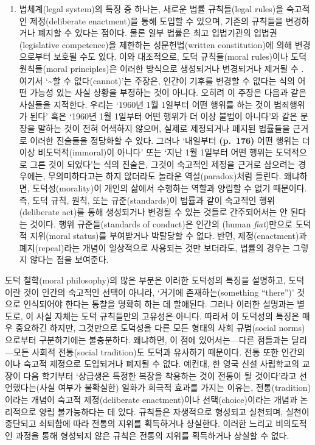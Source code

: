 \begin{enumerate}
\def\labelenumi{(\roman{enumi})}
\setcounter{enumi}{1}
\tightlist
\item
  법체계(legal system)의 특징 중 하나는, 새로운 법률 규칙들(legal
  rules)을 숙고적인 제정(deliberate enactment)을 통해 도입할 수 있으며,
  기존의 규칙들을 변경하거나 폐지할 수 있다는 점이다. 물론 일부 법률은
  최고 입법기관의 입법권(legislative competence)을 제한하는
  성문헌법(written constitution)에 의해 변경으로부터 보호될 수도 있다.
  이와 대조적으로, 도덕 규칙들(moral rules)이나 도덕 원칙들(moral
  principles)은 이러한 방식으로 생성되거나 변경되거나 제거될 수
  . 여기서 `\textasciitilde 할 수 없다(cannot)'는 주장은,
  인간이 기후를 변경할 수 없다는 식의 어떤 가능성 있는 사실 상황을
  부정하는 것이 아니다. 오히려 이 주장은 다음과 같은 사실들을 지적한다.
  우리는 `1960년 1월 1일부터 어떤 행위를 하는 것이 범죄행위가 된다' 혹은
  `1960년 1월 1일부터 어떤 행위가 더 이상 불법이 아니다'와 같은 문장을
  말하는 것이 전혀 어색하지 않으며, 실제로 제정되거나 폐지된 법률들을
  근거로 이러한 진술들을 정당화할 수 있다. 그러나 `내일부터
  \textbf{(p.~176)} 어떤 행위는 더 이상 비도덕적(immoral)이 아니다' 또는
  `지난 1월 1일부터 어떤 행위는 도덕적으로 그른 것이 되었다'는 식의
  진술은, 그것이 숙고적인 제정을 근거로 삼으려는 경우에는,
  무의미하다고는 하지 않더라도 놀라운 역설(paradox)처럼 들린다.
  왜냐하면, 도덕성(morality)이 개인의 삶에서 수행하는 역할과 양립할 수
  없기 때문이다. 즉, 도덕 규칙, 원칙, 또는 규준(standards)이 법률과 같이
  숙고적인 행위(deliberate act)를 통해 생성되거나 변경될 수 있는 것들로
  간주되어서는 안 된다는 것이다. 행위 규준들(standards of conduct)은
  인간의 (human \emph{fiat})만으로 도덕적 지위(moral
  status)를 부여받거나 박탈당할 수 없다. 반면, 제정(enactment)과
  폐지(repeal)라는 개념이 일상적으로 사용되는 것만 보더라도, 법률의
  경우는 그렇지 않다는 점을 보여준다.
\end{enumerate}

도덕 철학(moral philosophy)의 많은 부분은 이러한 도덕성의 특징을
설명하고, 도덕이란 것이 인간의 숙고적인 선택이 아니라, `거기에
존재하는(something ``there'')' 것으로 인식되어야 한다는 통찰을 명확히
하는 데 할애된다. 그러나 이러한 설명과는 별도로, 이 사실 자체는 도덕
규칙들만의 고유성은 아니다. 따라서 이 도덕성의 특징은 매우 중요하긴
하지만, 그것만으로 도덕성을 다른 모든 형태의 사회 규범(social
norms)으로부터 구분하기에는 불충분하다. 왜냐하면, 이 점에
있어서는---다른 점들과는 달리---모든 사회적 전통(social tradition)도
도덕과 유사하기 때문이다. 전통 또한 인간의 이나 숙고적
제정으로 도입되거나 폐지될 수 없다. 예컨대, 한 영국 신설 사립학교의
교장이 다음 학기부터 `상급생은 특정한 복장을 착용하는 것이 전통이 될
것이다'라고 선언했다는(사실 여부가 불확실한) 일화가 희극적 효과를 가지는
이유는, 전통(tradition)이라는 개념이 숙고적 제정(deliberate
enactment)이나 선택(choice)이라는 개념과 논리적으로 양립 불가능하다는 데
있다. 규칙들은 자생적으로 형성되고 실천되며, 실천이 중단되고 쇠퇴함에
따라 전통의 지위를 획득하거나 상실한다. 이러한 느리고 비의도적인 과정을
통해 형성되지 않은 규칙은 전통의 지위를 획득하거나 상실할 수 없다.

